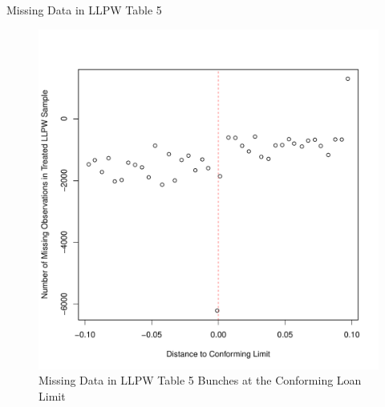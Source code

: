 \documentclass{article}
\begin{document}
\begin{table}

\caption{Missing Data in LLPW Table 5}

\begin{center}

\end{center}

\end{table}

\begin{figure}

\caption{Missing Data in LLPW Table 5 Bunches at the Conforming Loan Limit}

\begin{center}
\includegraphics[scale=0.5]{figures/missing_observations_bunching.pdf}
\end{center}

\end{figure}
\end{document}
